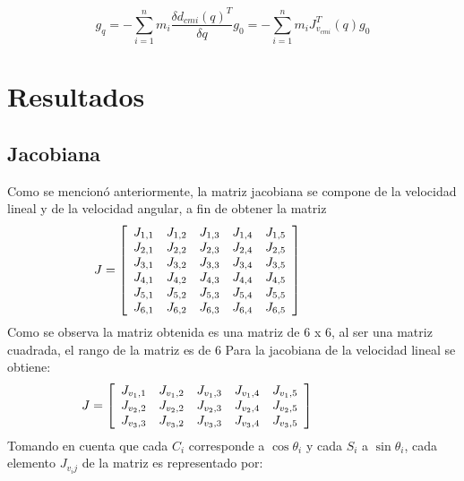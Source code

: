 \documentclass[journal]{IEEEtran}
\begin{document}
    $$g_{q}=- \sum_{i=1}^{n}m_{i}\frac{\delta d_{cmi}(q)^{T}}{\delta q}g_{0}=-\sum_{i=1}^{n}m_{i}J_{v_{cmi}}^{T}(q)g_{0}$$

    \section{Resultados}
    \subsection{Jacobiana} %
    Como se mencionó anteriormente, la matriz jacobiana se compone de la velocidad lineal y de la velocidad angular, a
    fin de obtener la matriz
    \begin{equation*}
        \hspace{-10mm}
        J = \left[
            \begin{array}{ccccc}
                J_{1,1} & J_{1,2} & J_{1,3} & J_{1,4} & J_{1,5}\\
                J_{2,1} & J_{2,2} & J_{2,3} & J_{2,4} & J_{2,5}\\
                J_{3,1} & J_{3,2} & J_{3,3} & J_{3,4} & J_{3,5}\\
                J_{4,1} & J_{4,2} & J_{4,3} & J_{4,4} & J_{4,5}\\
                J_{5,1} & J_{5,2} & J_{5,3} & J_{5,4} & J_{5,5}\\
                J_{6,1} & J_{6,2} & J_{6,3} & J_{6,4} & J_{6,5}\\
            \end{array} \right]
        \hspace{10mm}
    \end{equation*}
    Como se observa la matriz obtenida es una matriz de 6 x 6, al ser una matriz cuadrada, el rango de la matriz es de 6
    Para la jacobiana de la velocidad lineal se obtiene: 
    \begin{equation*}
        \hspace{-10mm}
        J = \left[
            \begin{array}{ccccc}
                J_{v_1 ,1} & J_{v_1 ,2} & J_{v_1 ,3} & J_{v_1 ,4} & J_{v_1 ,5}\\
                J_{v_2 ,2} & J_{v_2 ,2} & J_{v_2 ,3} & J_{v_2 ,4} & J_{v_2 ,5}\\
                J_{v_3 ,3 } & J_{v_3,2} & J_{v_3 ,3} & J_{v_3 ,4} & J_{v_3 ,5}\\
            \end{array}\right] \hspace{10mm}
    \end{equation*} 
    \noindent Tomando en cuenta que cada $C_i$ corresponde a $\cos \theta_i$ y cada $S_i$ a $\sin \theta_i$, cada elemento
    $J_{v_ij}$ de la matriz es representado por:
\end{document}

